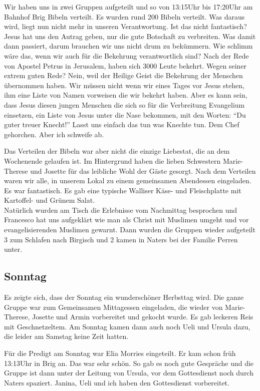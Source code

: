 \documentclass[fontsize=14pt]{mybib}
\begin{document}
    Wir haben uns in zwei Gruppen aufgeteilt und so von 13:15Uhr bis 17:20Uhr am Bahnhof Brig Bibeln verteilt. Es wurden rund 200 Bibeln verteilt. Was daraus wird, liegt nun nicht mehr in unseren Verantwortung. Ist das nicht fantastisch? Jesus hat uns den Autrag geben, nur die gute Botschaft zu verbreiten. Was damit dann passiert, darum brauchen wir uns nicht drum zu bekümmern. Wie schlimm wäre das, wenn wir auch für die Bekehrung verantwortlich sind?
    Nach der Rede von Apostel Petrus in Jerusalem, haben sich 3000 Leute bekehrt. Wegen seiner extrem guten Rede? Nein, weil der Heilige Geist die Bekehrung der Menschen übernommen haben. Wir müssen nicht wenn wir eines Tages vor Jesus stehen, ihm eine Liste von Namen vorweisen die wir bekehrt haben. Aber es kann sein, dass Jesus diesen jungen Menschen die sich so für die Verbreitung Evangelium einsetzen, ein Liste von Jesus unter die Nase bekommen, mit den Worten: \enquote{Du guter treuer Knecht!} Lasst uns einfach das tun was Knechte tun. Dem Chef gehorchen. Aber ich schweife ab.

    Das Verteilen der Bibeln war aber nicht die einzige Liebestat, die an dem Wochenende gelaufen ist. Im Hintergrund haben die lieben Schwestern Marie-Therese und Josette für das leibliche Wohl der Gäste gesorgt. Nach dem Verteilen waren wir alle, in unserem Lokal zu einem gemeinsamen Abendessen eingeladen. Es war fantastisch. Es gab eine typische Walliser Käse- und Fleischplatte mit Kartoffel- und Grünem Salat.\\

    Natürlich wurden am Tisch die Erlebnisse vom Nachmittag besprochen und Francesco hat uns aufgeklärt wie man als Christ mit Muslimen umgeht und vor evangelisierenden Muslimen gewarnt. Dann wurden die Gruppen wieder aufgeteilt 3 zum Schlafen nach Birgisch und 2 kamen in Naters bei der Familie Perren unter.

    \subsection*{Sonntag}
    Es zeigte sich, dass der Sonntag ein wunderschöner Herbsttag wird. Die ganze Gruppe war zum Gemeinsamen Mittagessen eingeladen, die wieder von Marie-Therese, Josette und Armin vorbereitet und gekocht wurde. Es gab leckeren Reis mit Geschnetzeltem. Am Sonntag kamen dann auch noch Ueli und Ursula dazu, die leider am Samstag keine Zeit hatten.

    Für die Predigt am Sonntag war Elia Morries eingeteilt. Er kam schon früh 13:13Uhr in Brig an. Das war sehr schön. So gab es noch gute Gespräche und die Gruppe ist dann unter der Leitung von Ursula, vor dem Gottesdienst noch durch Naters spaziert. Janina, Ueli und ich haben den Gottesdienst vorbereitet.
\end{document}
